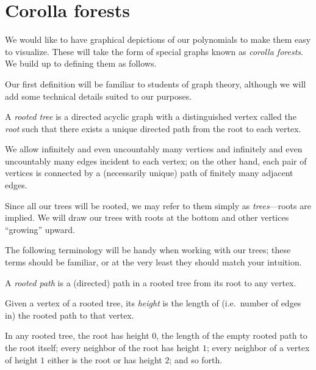 \documentclass[Book-Poly]{subfiles}
\begin{document}


\section{Corolla forests}

We would like to have graphical depictions of our polynomials to make them easy to visualize.
These will take the form of special graphs known as \emph{corolla forests}.
We build up to defining them as follows.



Our first definition will be familiar to students of graph theory, although we will add some technical details suited to our purposes.
\begin{definition}
    A \emph{rooted tree} is a directed acyclic graph with a distinguished vertex called the \emph{root} such that there exists a unique directed path from the root to each vertex.

    We allow infinitely and even uncountably many vertices and infinitely and even uncountably many edges incident to each vertex; on the other hand, each pair of vertices is connected by a (necessarily unique) path of finitely many adjacent edges.
\end{definition}
Since all our trees will be rooted, we may refer to them simply as \emph{trees}---roots are implied.
We will draw our trees with roots at the bottom and other vertices ``growing'' upward.

The following terminology will be handy when working with our trees; these terms should be familiar, or at the very least they should match your intuition.
\begin{definition}
    A \emph{rooted path} is a (directed) path in a rooted tree from its root to any vertex.


    Given a vertex of a rooted tree, its \emph{height} is the length of (i.e.\ number of edges in) the rooted path to that vertex.
\end{definition}
In any rooted tree, the root has height $0$, the length of the empty rooted path to the root itself; every neighbor of the root has height $1$; every neighbor of a vertex of height $1$ either is the root or has height $2$; and so forth.
\end{document}
